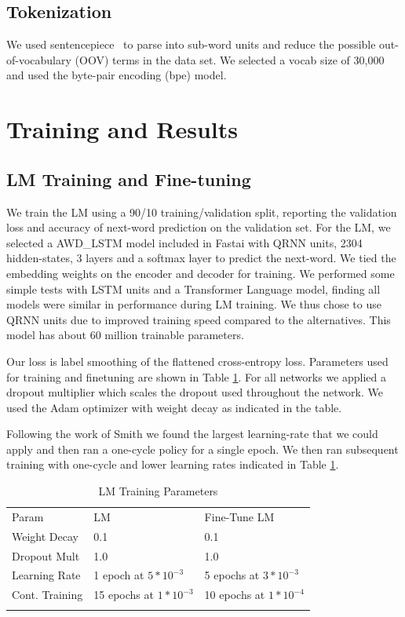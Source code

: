 \documentclass[smallextended]{svjour3}       %
\begin{document}
\subsection{Tokenization}
We used sentencepiece~\cite{SentencePiece:DBLP:journals/corr/abs-1808-06226} to parse into sub-word units and reduce the possible out-of-vocabulary (OOV) terms in the data set.  We selected a vocab size of 30,000 and used the byte-pair encoding (bpe) model. 

\section{Training and Results}
\label{sec:4}
\subsection{LM Training and Fine-tuning}
We train the LM using a 90/10 training/validation split, reporting the validation loss and accuracy of next-word prediction on the validation set. For the LM, we selected a AWD\_LSTM \cite{Merity:DBLP:journals/corr/abs-1708-02182} model included in Fastai with QRNN\cite{Bradbury:DBLP:journals/corr/BradburyMXS16} units, 2304 hidden-states, 3 layers and a softmax layer to predict the next-word.  We tied the embedding weights on the encoder and decoder for training.  We performed some simple tests with LSTM units and a Transformer Language model, finding all models were similar in performance during LM training. We thus chose to use QRNN units due to improved training speed compared to the alternatives. This model has about 60 million trainable parameters.  

Our loss is label smoothing\cite{Labelsmoothing:DBLP:journals/corr/PereyraTCKH17} of the flattened cross-entropy loss. 
Parameters used for training and finetuning are shown in Table \ref{tab:tab_training}.
For all networks we applied a dropout multiplier which scales the dropout used throughout the network.  We used the Adam optimizer with weight decay as indicated in the table.  

Following the work of Smith\cite{Smith:DBLP:journals/corr/abs-1803-09820}  we found the largest learning-rate that we could apply and then ran a one-cycle policy for a single epoch. We then ran subsequent training with one-cycle and lower learning rates indicated in Table \ref{tab:tab_training}.

\begin{table}[ht]
	\caption{LM Training Parameters}
	\label{tab:tab_training}       %
\begin{tabular}{lll}
	\hline\noalign{\smallskip}
	Param & LM & Fine-Tune LM \\
	\noalign{\smallskip}\hline\noalign{\smallskip}
	Weight Decay & 0.1 & 0.1 \\
	Dropout Mult & 1.0 & 1.0 \\
	Learning Rate & 1 epoch at $5*10^{-3}$ & 5 epochs at $3*10^{-3}$ \\
    Cont. Training & 15 epochs at $1*10^{-3}$ & 10 epochs at $1*10^{-4}$\\
	\noalign{\smallskip}\hline
\end{tabular}
\end{table}
\end{document}

